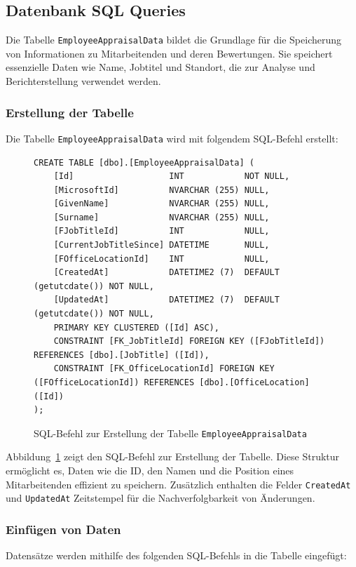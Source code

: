 \subsection{Datenbank SQL Queries}
Die Tabelle \texttt{EmployeeAppraisalData} bildet die Grundlage für die Speicherung von Informationen zu Mitarbeitenden und deren Bewertungen. Sie speichert essenzielle Daten wie Name, Jobtitel und Standort, die zur Analyse und Berichterstellung verwendet werden.

\subsubsection*{Erstellung der Tabelle}
Die Tabelle \texttt{EmployeeAppraisalData} wird mit folgendem SQL-Befehl erstellt:

\begin{figure}[H]
    \centering
    \caption{SQL-Befehl zur Erstellung der Tabelle \texttt{EmployeeAppraisalData}}
    \label{fig:create_table_query}
    \begin{verbatim}
CREATE TABLE [dbo].[EmployeeAppraisalData] (
    [Id]                   INT            NOT NULL,
    [MicrosoftId]          NVARCHAR (255) NULL,
    [GivenName]            NVARCHAR (255) NULL,
    [Surname]              NVARCHAR (255) NULL,
    [FJobTitleId]          INT            NULL,
    [CurrentJobTitleSince] DATETIME       NULL,
    [FOfficeLocationId]    INT            NULL,
    [CreatedAt]            DATETIME2 (7)  DEFAULT (getutcdate()) NOT NULL,
    [UpdatedAt]            DATETIME2 (7)  DEFAULT (getutcdate()) NOT NULL,
    PRIMARY KEY CLUSTERED ([Id] ASC),
    CONSTRAINT [FK_JobTitleId] FOREIGN KEY ([FJobTitleId]) REFERENCES [dbo].[JobTitle] ([Id]),
    CONSTRAINT [FK_OfficeLocationId] FOREIGN KEY ([FOfficeLocationId]) REFERENCES [dbo].[OfficeLocation] ([Id])
);
    \end{verbatim}
\end{figure}

Abbildung~\ref{fig:create_table_query} zeigt den SQL-Befehl zur Erstellung der Tabelle. Diese Struktur ermöglicht es, Daten wie die ID, den Namen und die Position eines Mitarbeitenden effizient zu speichern. Zusätzlich enthalten die Felder \texttt{CreatedAt} und \texttt{UpdatedAt} Zeitstempel für die Nachverfolgbarkeit von Änderungen.

\subsubsection*{Einfügen von Daten}
Datensätze werden mithilfe des folgenden SQL-Befehls in die Tabelle eingefügt:

